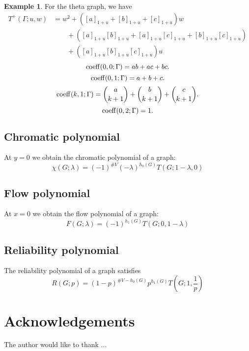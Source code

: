 \documentclass{amsart}
\theoremstyle{definition}
\newtheorem{eg}[thm]{Example}
\begin{document}
\begin{eg}
For the theta graph, we have
\begin{align*}
T^+(\Gamma; u,w) &= w^2 + ([a]_{1+u} + [b]_{1+u} + [c]_{1+u})w  \\
&\qquad + ([a]_{1+u} [b]_{1+u} + [a]_{1+u} [c]_{1+u}  + [b]_{1+u} [c]_{1+u}) \\
&\qquad + ([a]_{1+u} [b]_{1+u} [c]_{1+u})u
\end{align*}
$$ {\rm coeff}(0,0; \Gamma) = ab + ac + bc .$$
$$ {\rm coeff}(0,1; \Gamma) = a + b + c .$$
$$ {\rm coeff}(k,1; \Gamma) = \binom{a}{k+1} + \binom{b}{k+1} + \binom{c}{k+1} .$$
$$ {\rm coeff}(0,2; \Gamma) = 1 .$$

\end{eg}

\subsection{Chromatic polynomial}
At $y=0$ we obtain the chromatic polynomial of a graph:
\begin{equation*}
\chi(G; \lambda) = (-1)^{\#V } (-\lambda)^{h_0(G)} T(G; 1-\lambda,0)
\end{equation*}

\subsection{Flow polynomial}
At $x = 0$ we obtain the flow polynomial of a graph:
\begin{equation*}
F(G; \lambda) = (-1)^{h_1(G)} T(G; 0, 1 - \lambda)
\end{equation*}

\subsection{Reliability polynomial}
The reliability polynomial of a graph satisfies
\begin{equation*}
R(G; p) = (1 - p)^{\# V - h_0(G)} p^{h_1(G)} T(G; 1, \frac1p )
\end{equation*}

\section*{Acknowledgements}
The author would like to thank ...
\end{document}
